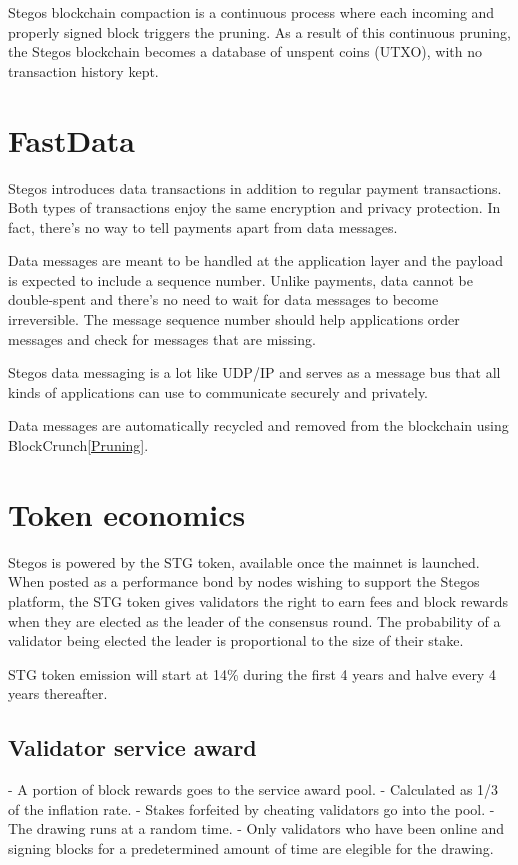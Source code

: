 \documentclass[a4paper, 10pt, conference]{ieeeconf}
\begin{document}
Stegos blockchain compaction is a continuous process where each incoming and properly signed block triggers the pruning. As a result of this continuous pruning, the Stegos blockchain becomes a database of unspent coins (UTXO), with no transaction history kept.

\section{FastData}\label{Data}
Stegos introduces data transactions in addition to regular payment transactions. Both types of transactions enjoy the same encryption and privacy protection. In fact, there's no way to tell payments apart from data messages. 

Data messages are meant to be handled at the application layer and the payload is expected to include a sequence number. Unlike payments, data cannot be double-spent and there's no need to wait for data messages to become irreversible. The message sequence number should help applications order messages and check for messages that are missing. 

Stegos data messaging is a lot like UDP/IP and serves as a message bus that all kinds of applications can use to communicate securely and privately.

Data messages are automatically recycled and removed from the blockchain using BlockCrunch\ref{Pruning}.

\section{Token economics}\label{Tokenomics}
Stegos is powered by the STG token, available once the mainnet is launched. When posted as a performance bond by nodes wishing to support the Stegos platform, the STG token gives validators the right to earn fees and block rewards when they are elected as the leader of the consensus round. The probability of a validator being elected the leader is proportional to the size of their stake.

STG token emission will start at 14\% during the first 4 years and halve every 4 years thereafter.

\subsection{Validator service award}\label{ValidatorAward}

- A portion of block rewards goes to the service award pool. 
- Calculated as 1/3 of the inflation rate.
- Stakes forfeited by cheating validators go into the pool.
- The drawing runs at a random time. 
- Only validators who have been online and signing blocks for a predetermined amount of time are elegible for the drawing.
\end{document}
